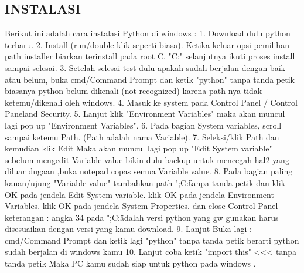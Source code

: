 \subsection{INSTALASI}
Berikut ini adalah cara instalasi Python di windows :
1.  Download dulu python terbaru.
2.  Install (run/double klik seperti biasa).
     Ketika keluar opsi pemilihan path installer biarkan terinstall pada root C. "C:"
     selanjutnya ikuti proses install sampai selesai.
3.  Setelah selesai test dulu apakah sudah berjalan dengan baik atau belum,
     buka cmd/Command Prompt dan ketik "python"  tanpa tanda petik
     biasanya python belum dikenali (not recognized) karena path nya tidak ketemu/dikenali oleh windows.
4.  Masuk ke system pada Control Panel / Control Panel\System and Security\System.
5.  Lanjut klik "Environment Variables" maka akan muncul lagi pop up "Environment Variables".
6.  Pada bagian System variables, scroll sampai ketemu Path. (Path adalah nama Variable).
7.  Seleksi/klik Path dan kemudian klik Edit
     Maka akan muncul lagi pop up "Edit System variable"
     sebelum mengedit Variable value bikin dulu backup untuk mencegah hal2 yang diluar dugaan ,buka notepad copas semua Variable value.
8. Pada bagian paling kanan/ujung "Variable value"
    tambahkan path  ";C:\"  tanpa tanda petik
    dan klik OK pada jendela Edit System variable.
    klik OK pada jendela Environment Variables.
    klik OK pada jendela System Properties.
    dan close Control Panel
    keterangan : angka 34 pada ";C:\"adalah versi python yang gw gunakan harus disesuaikan dengan versi yang kamu download.
9. Lanjut Buka lagi : cmd/Command Prompt dan ketik lagi "python" tanpa tanda petik 
    berarti python sudah berjalan di windows kamu
10. Lanjut coba ketik "import this" <<< tanpa tanda petik
     Maka PC kamu sudah siap untuk python pada windows \cite{nahado2015bumbu}.





